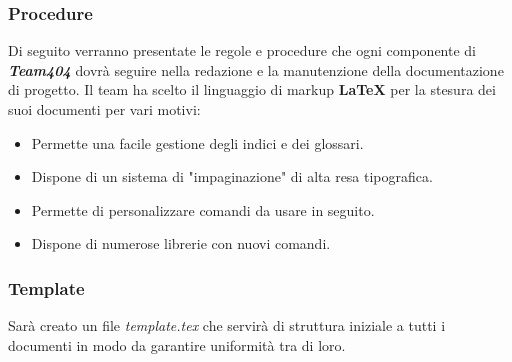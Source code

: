 \documentclass[a4paper,11pt]{article}
\begin{document}
			\subsubsection{Procedure}
			Di seguito verranno presentate le regole e procedure che ogni componente di \textbf{\emph{Team404}} dovrà seguire nella redazione e la manutenzione  della documentazione di progetto. Il team ha scelto il linguaggio di markup \textbf{\LaTeX} per la  stesura dei suoi documenti per vari motivi:
			\begin{itemize}
			\item Permette una facile gestione degli indici e dei glossari.
			\item Dispone di  un sistema di "impaginazione" di alta resa tipografica.
			\item Permette di personalizzare comandi da usare in seguito.
			\item Dispone di numerose librerie con nuovi comandi.
	\end{itemize}		 
			\subsubsection{Template}
			Sarà creato un file \textit{template.tex}  che servirà di struttura iniziale a tutti i documenti in modo da garantire uniformità tra di loro.
\end{document}
